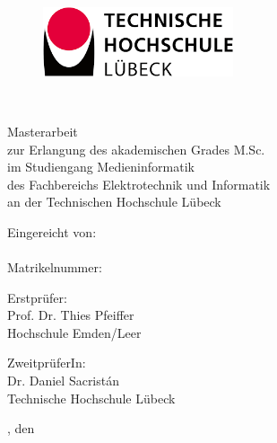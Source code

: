 \begin{titlepage}

\begin{center}

\begin{figure}[tbh]
 \centering
 \includegraphics[width=0.5\textwidth]{images/th-logo.png}
\end{figure}

\vspace{1.cm}

{
 \fontsize{20}{28}\selectfont
 \myTitle\\[0.5cm]
}

\fontsize{12}{12}\selectfont

\vspace{1.cm}

Masterarbeit\\
zur Erlangung des akademischen Grades M.Sc.\\
im Studiengang Medieninformatik\\
des Fachbereichs Elektrotechnik und Informatik\\
an der Technischen Hochschule Lübeck

\vspace{0.5cm}

Eingereicht von:\\
\myAuthor\\
Matrikelnummer: \myMatrikelnummer

\vspace{0.5cm}

Erstprüfer:\\
Prof. Dr. Thies Pfeiffer\\
Hochschule Emden/Leer\\


\vspace{.2cm}

ZweitprüferIn:\\
Dr. Daniel Sacristán\\
Technische Hochschule Lübeck\\


\vspace{0.5cm}

\myOrt, den \myDate

\end{center}
\end{titlepage}
